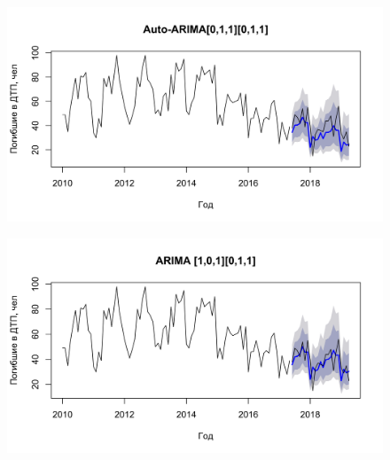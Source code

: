 \documentclass[14pt, a4paper]{extarticle}\usepackage[]{graphicx}\usepackage[]{color}
\makeatletter
\def\maxwidth{ %
  \ifdim\Gin@nat@width>\linewidth
    \linewidth
  \else
    \Gin@nat@width
  \fi
}
\newenvironment{knitrout}{}{} %
\makeatother
\begin{document}
\begin{minipage}[t]{0.5\textwidth}
\begin{figure}[H]
\begin{knitrout}
\color{fgcolor}

{\centering \includegraphics[width=\maxwidth]{figure/unnamed-chunk-19-1} 

}



\end{knitrout}
\end{figure}
\end{minipage}

\begin{minipage}[t]{0.5\textwidth}
\begin{figure}[H]
\begin{knitrout}
\color{fgcolor}

{\centering \includegraphics[width=\maxwidth]{figure/unnamed-chunk-20-1} 

}



\end{knitrout}
\end{figure}
\end{minipage}
\end{document}
